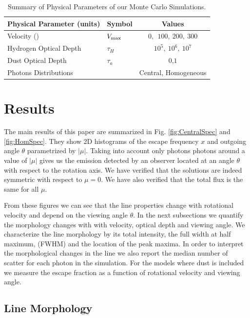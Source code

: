 \documentclass{emulateapj}
\newcommand{\ly}{{\ifmmode{{\rm Ly}\alpha~}\else{Ly$\alpha$~}\fi}}
\newcommand{\kms}{{\ifmmode{{\mathrm{\,km\ s}^{-1}}}\else{\,km~s$^{-1}$}\fi}}
\begin{document}
\begin{table}
\begin{center}
\begin{tabular}{llc}\hline\hline
Physical Parameter (units) & Symbol & Values\\\hline
Velocity (\kms) & $V_{\rm max}$&$0,\ \ 100,\ 200,\ 300$\\
Hydrogen Optical Depth & $\tau_{H} $ & $10^{5},\ 10^{6},\ 10^{7}$\\
Dust Optical Depth & $\tau_{a}$ & $0$,$1$\\
Photons Distributions & & Central, Homogeneous\\\hline\hline
\end{tabular}
\caption{
  Summary of Physical Parameters of our Monte Carlo Simulations.} 
\label{table:models}
\end{center}
\end{table}




\section{Results}
\label{sec:results}

The main results of this paper are summarized in Fig.
\ref{fig:CentralSpec} and \ref{fig:HomSpec}. 
They show 2D histograms of the escape frequency $x$ and outgoing angle
$\theta$ parametrized by $|\mu|$. 
Taking into account only photons photons around a value
of $|\mu|$ gives us the emission detected by an observer located at an
angle $\theta$ with respect to the rotation axis. 
We have verified that the solutions are indeed symmetric with respect
to $\mu=0$. We have also verified that the total flux is the same for all $\mu$.

From these figures we can see that the line properties change with
rotational velocity and depend on the viewing angle $\theta$.  
In the next subsections we quantify the morphology changes with with
velocity, optical depth and viewing angle.  
We characterize the line morphology by its total intensity, the full
width at half maximum, (FWHM) and the location of the peak maxima. 
In order to interpret the
morphological changes in the line we also report the median number of
scatter for each \ly photon in the simulation. 
For the models where dust is included we measure the escape fraction
as a function of rotational velocity and viewing angle.   

\subsection{Line Morphology}
\label{sec:angles}
\end{document}
